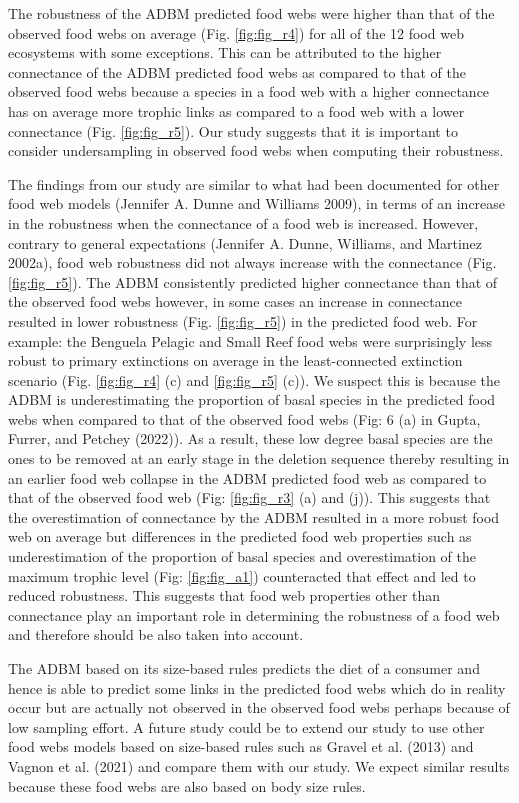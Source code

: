 \documentclass{article}
\begin{document}
The robustness of the ADBM predicted food webs were higher than that of
the observed food webs on average (Fig. \ref{fig:fig_r4}) for all of the
12 food web ecosystems with some exceptions. This can be attributed to
the higher connectance of the ADBM predicted food webs as compared to
that of the observed food webs because a species in a food web with a
higher connectance has on average more trophic links as compared to a
food web with a lower connectance (Fig. \ref{fig:fig_r5}). Our study
suggests that it is important to consider undersampling in observed food
webs when computing their robustness.

The findings from our study are similar to what had been documented for
other food web models (Jennifer A. Dunne and Williams 2009), in terms of
an increase in the robustness when the connectance of a food web is
increased. However, contrary to general expectations (Jennifer A. Dunne,
Williams, and Martinez 2002a), food web robustness did not always
increase with the connectance (Fig. \ref{fig:fig_r5}). The ADBM
consistently predicted higher connectance than that of the observed food
webs however, in some cases an increase in connectance resulted in lower
robustness (Fig. \ref{fig:fig_r5}) in the predicted food web. For
example: the Benguela Pelagic and Small Reef food webs were surprisingly
less robust to primary extinctions on average in the least-connected
extinction scenario (Fig. \ref{fig:fig_r4} (c) and \ref{fig:fig_r5}
(c)). We suspect this is because the ADBM is underestimating the
proportion of basal species in the predicted food webs when compared to
that of the observed food webs (Fig: 6 (a) in Gupta, Furrer, and Petchey
(2022)). As a result, these low degree basal species are the ones to be
removed at an early stage in the deletion sequence thereby resulting in
an earlier food web collapse in the ADBM predicted food web as compared
to that of the observed food web (Fig: \ref{fig:fig_r3} (a) and (j)).
This suggests that the overestimation of connectance by the ADBM
resulted in a more robust food web on average but differences in the
predicted food web properties such as underestimation of the proportion
of basal species and overestimation of the maximum trophic level (Fig:
\ref{fig:fig_a1}) counteracted that effect and led to reduced
robustness. This suggests that food web properties other than
connectance play an important role in determining the robustness of a
food web and therefore should be also taken into account.

The ADBM based on its size-based rules predicts the diet of a consumer
and hence is able to predict some links in the predicted food webs which
do in reality occur but are actually not observed in the observed food
webs perhaps because of low sampling effort. A future study could be to
extend our study to use other food webs models based on size-based rules
such as Gravel et al. (2013) and Vagnon et al. (2021) and compare them
with our study. We expect similar results because these food webs are
also based on body size rules.
\end{document}
